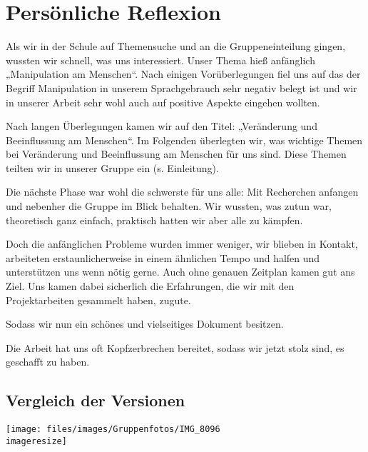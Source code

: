 \chapter{Persönliche Reflexion}
\label{sec:reflexion}

Als wir in der Schule auf Themensuche und an die Gruppeneinteilung gingen, wussten wir schnell, was
uns interessiert. Unser Thema hieß anfänglich „Manipulation am Menschen“. Nach einigen
Vorüberlegungen fiel uns auf das der Begriff Manipulation in unserem Sprachgebrauch sehr negativ
belegt ist und wir in unserer Arbeit sehr wohl auch auf positive Aspekte eingehen wollten.

Nach langen Überlegungen kamen wir auf den Titel: „Veränderung und Beeinflussung am Menschen“. Im
Folgenden überlegten wir, was wichtige Themen bei Veränderung und Beeinflussung am Menschen für uns
sind. Diese Themen teilten wir in unserer Gruppe ein (s. Einleitung).

Die nächste Phase war wohl die schwerste für uns alle: Mit Recherchen anfangen und nebenher die
Gruppe im Blick behalten. Wir wussten, was zutun war, theoretisch ganz einfach, praktisch hatten
wir aber alle zu kämpfen.

Doch die anfänglichen Probleme wurden immer weniger, wir blieben in Kontakt, arbeiteten
erstaunlicherweise in einem ähnlichen Tempo und halfen und unterstützen uns wenn nötig gerne. Auch
ohne genauen Zeitplan kamen gut ans Ziel. Uns kamen dabei sicherlich die
Erfahrungen, die wir mit den Projektarbeiten gesammelt haben, zugute.

Sodass wir nun ein schönes und vielseitiges Dokument besitzen.

Die Arbeit hat uns oft Kopfzerbrechen bereitet, sodass wir jetzt stolz sind, es geschafft zu haben.

\section{Vergleich der Versionen}


\begin{figurewrapper}
	\texttt{[image: files/images/Gruppenfotos/IMG\_8096\\imageresize]}
	\label{fig:group_picture}
\end{figurewrapper}
